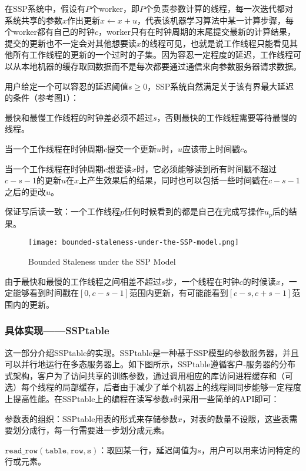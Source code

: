\documentclass[11pt]{article}
\begin{document}
    在SSP系统中，假设有$P$个worker，即$P$个负责参数计算的线程，每一次迭代都对系统共享的参数$x$作出更新$x\leftarrow x+u$，代表该机器学习算法中某一计算步骤，每个worker都有自己的时钟$c$，worker只有在时钟周期的末尾提交最新的计算结果，提交的更新也不一定会对其他想要读$x$的线程可见，也就是说工作线程只能看见其他所有工作线程的更新的一个过时的子集。因为容忍一定程度的延迟，工作线程可以从本地机器的缓存取回数据而不是每次都要通过通信来向参数服务器请求数据。

    用户给定一个可以容忍的延迟阈值$s \geq 0$，SSP系统自然满足关于该有界最大延迟的条件（参考图1）：

    \textbullet 最快和最慢工作线程的时钟差必须不超过$s$，否则最快的工作线程需要等待最慢的线程。

    \textbullet 当一个工作线程在时钟周期$c$提交一个更新$u$时，$u$应该带上时间戳$c$。

    \textbullet 当一个工作线程在时钟周期$c$想要读$x$时，它必须能够读到所有时间戳不超过$c-s-1$的更新$u$在$x$上产生效果后的结果，同时也可以包括一些时间戳在$c-s-1$之后的更改$u$。

    \textbullet 保证写后读一致：一个工作线程$p$任何时候看到的都是自己在完成写操作$u_p$后的结果。
    \begin{figure}[H]
        \centering
        \texttt{[image: bounded-staleness-under-the-SSP-model.png]}
        \caption{Bounded Staleness under the SSP Model}
    \end{figure}

    由于最快和最慢的工作线程之间相差不超过$s$步，一个线程在时钟$c$的时候读$x$，一定能够看到时间戳在$[0,c-s-1]$范围内更新，有可能能看到$[c-s, c+s-1]$范围内的更新。

    \subsubsection{具体实现——SSPtable}
    这一部分介绍SSPtable的实现。SSPtable是一种基于SSP模型的参数服务器，并且可以并行地运行在多态服务器上。如下图所示，SSPtable遵循客户-服务器的分布式架构，客户为了访问共享的训练参数，通过调用相应的库访问进程缓存和（可选）每个线程的局部缓存，后者由于减少了单个机器上的线程间同步能够一定程度上提高性能。在SSPtable上的编程在读写参数$x$时采用一些简单的API即可：

    \textbullet 参数表的组织：SSPtable用表的形式来存储参数$x$，对表的数量不设限，这些表需要划分成行，每一行需要进一步划分成元素。

    \textbullet $\mathtt{read\_row(table, row, s)}$：取回某一行，延迟阈值为$s$，用户可以用来访问特定的行或元素。
\end{document}
